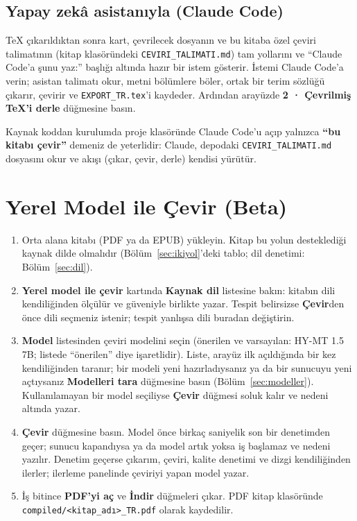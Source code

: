 \documentclass[11pt,a4paper]{article}
\newcommand{\dugme}[1]{\textsf{\bfseries #1}}
\newcommand{\dosya}[1]{\texttt{#1}}
\begin{document}
\subsection{Yapay zekâ asistanıyla (Claude Code)}\label{sec:claude}
TeX çıkarıldıktan sonra kart, çevrilecek dosyanın ve bu kitaba özel çeviri
talimatının (kitap klasöründeki \dosya{CEVIRI\_TALIMATI.md}) tam yollarını ve
``Claude Code'a şunu yaz:'' başlığı altında hazır bir istem gösterir. İstemi
Claude Code'a verin; asistan talimatı okur, metni bölümlere böler, ortak bir
terim sözlüğü çıkarır, çevirir ve \dosya{EXPORT\_TR.tex}'i kaydeder. Ardından
arayüzde \dugme{2 · Çevrilmiş TeX'i derle} düğmesine basın.

Kaynak koddan kurulumda proje klasöründe Claude Code'u açıp yalnızca
\textbf{``bu kitabı çevir''} demeniz de yeterlidir: Claude, depodaki
\dosya{CEVIRI\_TALIMATI.md} dosyasını okur ve akışı (çıkar, çevir, derle)
kendisi yürütür.

\section{Yerel Model ile Çevir (Beta)}

\begin{enumerate}
  \item Orta alana kitabı (PDF ya da EPUB) yükleyin. Kitap bu yolun
        desteklediği kaynak dilde olmalıdır (Bölüm~\ref{sec:ikiyol}'deki
        tablo; dil denetimi: Bölüm~\ref{sec:dil}).
  \item \dugme{Yerel model ile çevir} kartında \dugme{Kaynak dil} listesine
        bakın: kitabın dili kendiliğinden ölçülür ve güveniyle birlikte yazar.
        Tespit belirsizse \dugme{Çevir}den önce dili seçmeniz istenir; tespit
        yanlışsa dili buradan değiştirin.
  \item \dugme{Model} listesinden çeviri modelini seçin (önerilen ve
        varsayılan: HY-MT 1.5 7B; listede ``önerilen'' diye işaretlidir). Liste, arayüz ilk açıldığında bir kez
        kendiliğinden taranır; bir modeli yeni hazırladıysanız ya da bir
        sunucuyu yeni açtıysanız \dugme{Modelleri tara} düğmesine basın
        (Bölüm~\ref{sec:modeller}). Kullanılamayan bir model seçiliyse
        \dugme{Çevir} düğmesi soluk kalır ve nedeni altında yazar.
  \item \dugme{Çevir} düğmesine basın. Model önce birkaç saniyelik son bir
        denetimden geçer; sunucu kapandıysa ya da model artık yoksa iş
        başlamaz ve nedeni yazılır. Denetim geçerse çıkarım, çeviri, kalite
        denetimi ve dizgi kendiliğinden ilerler; ilerleme panelinde çeviriyi
        yapan model yazar.
  \item İş bitince \dugme{PDF'yi aç} ve \dugme{İndir} düğmeleri çıkar. PDF
        kitap klasöründe \dosya{compiled/\allowbreak<kitap\_adı>\_TR.pdf}
        olarak kaydedilir.
\end{enumerate}
\end{document}
